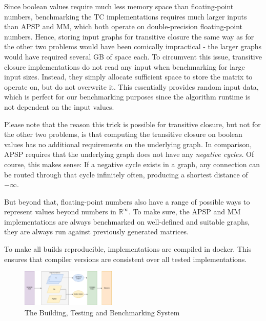 Since boolean values require much less memory space than floating-point numbers, benchmarking the TC implementations requires much larger inputs than APSP and MM, which both operate on double-precision floating-point numbers.
Hence, storing input graphs for transitive closure the same way as for the other two problems would have been comically impractical - the larger graphs would have required several GB of space each.
To circumvent this issue, transitive closure implementations do not read any input when benchmarking for large input sizes. Instead, they simply allocate sufficient space to store the matrix to operate on, but do not overwrite it. This essentially provides random input data, which is perfect for our benchmarking purposes since the algorithm runtime is not dependent on the input values.

Please note that the reason this trick is possible for transitive closure, but not for the other two problems, is that computing the transitive closure on boolean values has no additional requirements on the underlying graph.
In comparison, APSP requires that the underlying graph does not have any \emph{negative cycles.} Of course, this makes sense: If a negative cycle exists in a graph, any connection can be routed through that cycle infinitely often, producing a shortest distance of \(-\infty\).

But beyond that, floating-point numbers also have a range of possible ways to represent values beyond numbers in \(\mathbb{R}^{\infty}\). To make sure, the APSP and MM implementations are always benchmarked on well-defined and suitable graphs, they are always run against previously generated matrices.

To make all builds reproducible, implementations are compiled in docker. This ensures that compiler versions are consistent over all tested implementations.

\begin{figure}[h]
    \centering
    \includegraphics[width=0.4\textwidth]{img/setup.png}
    \caption{The Building, Testing and Benchmarking System}
    \label{img:setup}
\end{figure}

